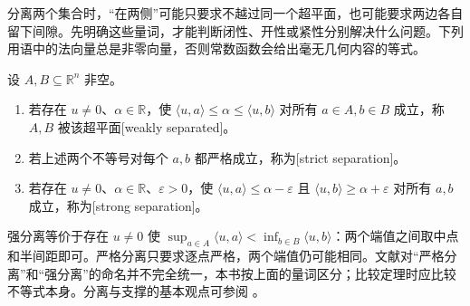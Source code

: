 分离两个集合时，“在两侧”可能只要求不越过同一个超平面，也可能要求两边各自留下间隙。先明确这些量词，才能判断闭性、开性或紧性分别解决什么问题。下列用语中的法向量总是非零向量，否则常数函数会给出毫无几何内容的等式。

\begin{definition}\label{g1:def:convex-separation}
	设 \(A,B\subseteq\mathbb R^n\) 非空。
	\begin{enumerate}
		\item 若存在 \(u\ne0\)、\(\alpha\in\mathbb R\)，使 \(\langle u,a\rangle\leq\alpha\leq\langle u,b\rangle\) 对所有 \(a\in A,b\in B\) 成立，称 \(A,B\) 被该超平面[weakly separated]。
		\item 若上述两个不等号对每个 \(a,b\) 都严格成立，称为[strict separation]。
		\item 若存在 \(u\ne0\)、\(\alpha\in\mathbb R\)、\(\varepsilon>0\)，使 \(\langle u,a\rangle\leq\alpha-\varepsilon\) 且 \(\langle u,b\rangle\geq\alpha+\varepsilon\) 对所有 \(a,b\) 成立，称为[strong separation]。
	\end{enumerate}
\end{definition}

强分离等价于存在 \(u\ne0\) 使 \(\sup_{a\in A}\langle u,a\rangle<\inf_{b\in B}\langle u,b\rangle\)：两个端值之间取中点和半间距即可。严格分离只要求逐点严格，两个端值仍可能相同。文献对“严格分离”和“强分离”的命名并不完全统一，本书按上面的量词区分；比较定理时应比较不等式本身。分离与支撑的基本观点可参阅 \cite[第2章，第2.5节]{BoydVandenberghe2004}。


